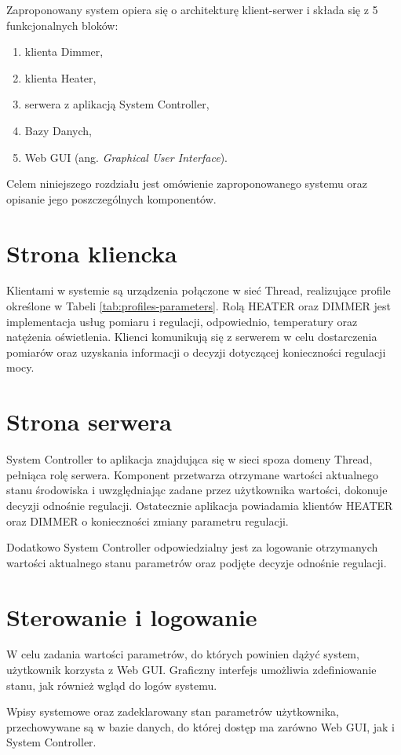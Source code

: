 Zaproponowany system opiera się o architekturę klient-serwer i składa się z 5 funkcjonalnych bloków:
\begin{enumerate}
    \item klienta Dimmer,
    \item klienta Heater,
    \item serwera z aplikacją System Controller,
    \item Bazy Danych,
    \item Web GUI (ang. \textit{Graphical User Interface}).
\end{enumerate}

Celem niniejszego rozdziału jest omówienie zaproponowanego systemu oraz opisanie jego poszczególnych komponentów. 

\section{Strona kliencka}
\label{sec:system-clients}

Klientami w systemie są urządzenia połączone w sieć Thread, realizujące profile określone w Tabeli \ref{tab:profiles-parameters}. Rolą HEATER oraz DIMMER jest implementacja usług pomiaru i regulacji, odpowiednio, temperatury oraz natężenia oświetlenia.
Klienci komunikują się z serwerem w celu dostarczenia pomiarów oraz uzyskania informacji o decyzji dotyczącej konieczności regulacji mocy.
    
\section{Strona serwera}

System Controller to aplikacja znajdująca się w sieci spoza domeny Thread, pełniąca rolę serwera. Komponent przetwarza otrzymane wartości aktualnego stanu środowiska i uwzględniając zadane przez użytkownika wartości, dokonuje decyzji odnośnie regulacji. Ostatecznie aplikacja powiadamia klientów HEATER oraz DIMMER o konieczności zmiany parametru regulacji.

Dodatkowo System Controller odpowiedzialny jest za logowanie otrzymanych wartości aktualnego stanu parametrów oraz podjęte decyzje odnośnie regulacji.

\section{Sterowanie i logowanie}

W celu zadania wartości parametrów, do których powinien dążyć system, użytkownik korzysta z Web GUI. Graficzny interfejs umożliwia zdefiniowanie stanu, jak również wgląd do logów systemu.

Wpisy systemowe oraz zadeklarowany stan parametrów użytkownika, przechowywane są w bazie danych, do której dostęp ma zarówno Web GUI, jak i System Controller.